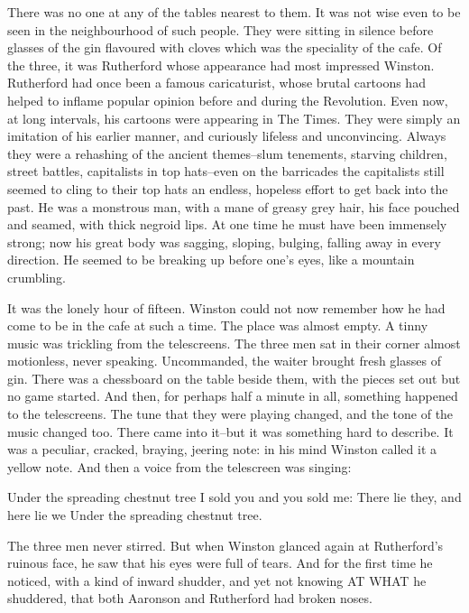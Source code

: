 \documentclass{article}
\begin{document}
There was no one at any of the tables nearest to them. It was not wise
even to be seen in the neighbourhood of such people. They were sitting
in silence before glasses of the gin flavoured with cloves which was the
speciality of the cafe. Of the three, it was Rutherford whose appearance
had most impressed Winston. Rutherford had once been a famous caricaturist,
whose brutal cartoons had helped to inflame popular opinion before and
during the Revolution. Even now, at long intervals, his cartoons were
appearing in The Times. They were simply an imitation of his earlier
manner, and curiously lifeless and unconvincing. Always they were a
rehashing of the ancient themes--slum tenements, starving children, street
battles, capitalists in top hats--even on the barricades the capitalists
still seemed to cling to their top hats an endless, hopeless effort to
get back into the past. He was a monstrous man, with a mane of greasy
grey hair, his face pouched and seamed, with thick negroid lips. At one
time he must have been immensely strong; now his great body was sagging,
sloping, bulging, falling away in every direction. He seemed to be breaking
up before one's eyes, like a mountain crumbling.

It was the lonely hour of fifteen. Winston could not now remember how he
had come to be in the cafe at such a time. The place was almost empty. A
tinny music was trickling from the telescreens. The three men sat in their
corner almost motionless, never speaking. Uncommanded, the waiter brought
fresh glasses of gin. There was a chessboard on the table beside them, with
the pieces set out but no game started. And then, for perhaps half a minute
in all, something happened to the telescreens. The tune that they were
playing changed, and the tone of the music changed too. There came into
it--but it was something hard to describe. It was a peculiar, cracked,
braying, jeering note: in his mind Winston called it a yellow note. And
then a voice from the telescreen was singing:


  Under the spreading chestnut tree
  I sold you and you sold me:
  There lie they, and here lie we
  Under the spreading chestnut tree.


The three men never stirred. But when Winston glanced again at Rutherford's
ruinous face, he saw that his eyes were full of tears. And for the first
time he noticed, with a kind of inward shudder, and yet not knowing
AT WHAT he shuddered, that both Aaronson and Rutherford had broken noses.
\end{document}
